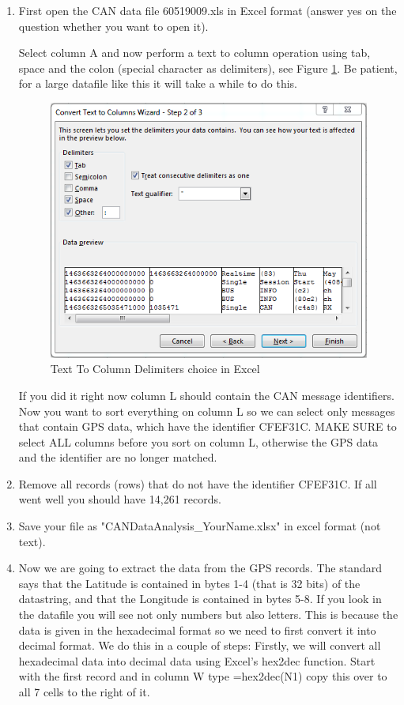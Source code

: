 \documentclass[12pt,letterpaper]{article}
\begin{document}
\begin{enumerate}
	\item First open the CAN data file 60519009.xls in Excel format (answer yes on the question whether you want to open it).
	
	Select column A and now perform a text to column operation using tab, space and the colon (special character as delimiters), see Figure \ref{fig:TextToColumnDelimiters}. Be patient, for a large datafile like this it will take a while to do this.
	
	\begin{figure}
		\centering
		\includegraphics[width=0.8\linewidth]{TextToColumnDelimiters}
		\caption{Text To Column Delimiters choice in Excel}
		\label{fig:TextToColumnDelimiters}
	\end{figure}
	
	If you did it right now column L should contain the CAN message identifiers. Now you want to sort everything on column L so we can select only messages that contain GPS data, which have the identifier CFEF31C. MAKE SURE to select ALL columns before you sort on column L, otherwise the GPS data and the identifier are no longer matched. 
	\item Remove all records (rows) that do not have the identifier CFEF31C. If all went well you should have 14,261 records.
	
	\item 	Save your file as "CANDataAnalysis\_YourName.xlsx" in excel format (not text).
	\item	Now we are going to extract the data from the GPS records. The standard says that the Latitude is contained in bytes 1-4 (that is 32 bits) of the datastring, and that the Longitude is contained in bytes 5-8. If you look in the datafile you will see not only numbers but also letters. This is because the data is given in the hexadecimal format so we need to first convert it into decimal format. We do this in a couple of steps: Firstly, we will convert all hexadecimal data into decimal data using Excel's hex2dec function. Start with the first record and in column W type =hex2dec(N1) copy this over to all 7 cells to the right of it.\\
	

\end{enumerate}
\end{document}
